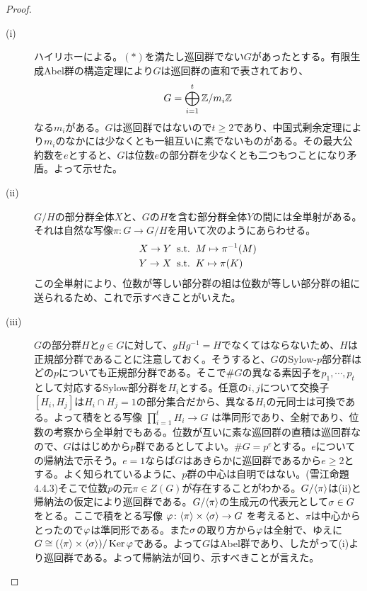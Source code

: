 \begin{proof} ${}$
  \begin{description}
    \item[(i)] ハイリホーによる。$(*)$を満たし巡回群でない$G$があったとする。有限生成Abel群の構造定理により$G$は巡回群の直和で表されており、
    \[
    G = \bigoplus_{i=1}^t {\mathbb Z} / m_i {\mathbb Z}
    \]
    なる$m_i$がある。$G$は巡回群ではないので$t \geq 2$であり、中国式剰余定理により$m_i$のなかには少なくとも一組互いに素でないものがある。その最大公約数を$e$とすると、$G$は位数$e$の部分群を少なくとも二つもつことになり矛盾。よって示せた。
    \item[(ii)] $G/H$の部分群全体$X$と、$G$の$H$を含む部分群全体$Y$の間には全単射がある。それは自然な写像$\pi \colon G \to G/H$を用いて次のようにあらわせる。
    \begin{align*}
      &X \to Y \; \; \text{s.t.} \; \; M \mapsto \pi^{-1}(M) \\
      &Y \to X \; \; \text{s.t.} \; \; K \mapsto \pi(K)
    \end{align*}
    この全単射により、位数が等しい部分群の組は位数が等しい部分群の組に送られるため、これで示すべきことがいえた。
    \item[(iii)] $G$の部分群$H$と$g \in G$に対して、$gHg^{-1} = H$でなくてはならないため、$H$は正規部分群であることに注意しておく。そうすると、$G$のSylow-$p$部分群はどの$p$についても正規部分群である。そこで$\# G$の異なる素因子を$p_1, \cdots ,p_t$として対応するSylow部分群を$H_i$とする。任意の$i,j$について交換子$[H_i,H_j]$は$H_i \cap H_j = 1$の部分集合だから、異なる$H_i$の元同士は可換である。よって積をとる写像
    $
    \prod_{i=1}^t H_i \to G
    $
    は準同形であり、全射であり、位数の考察から全単射でもある。位数が互いに素な巡回群の直積は巡回群なので、$G$ははじめから$p$群であるとしてよい。$\# G = p^e$とする。$e$についての帰納法で示そう。$e=1$ならば$G$はあきらかに巡回群であるから$e \geq 2$とする。よく知られているように、$p$群の中心は自明ではない。(雪江\cite{雪代1}命題4.4.3)そこで位数$p$の元$\pi \in Z(G)$が存在することがわかる。$G/\langle \pi \rangle$は(ii)と帰納法の仮定により巡回群である。$G/\langle \pi \rangle$の生成元の代表元として${\sigma} \in G$をとる。ここで積をとる写像
    $
    {\varphi} \colon \langle \pi \rangle \times \langle {\sigma} \rangle \to G
    $
    を考えると、$\pi$は中心からとったので${\varphi}$は準同形である。また${\sigma}$の取り方から${\varphi}$は全射で、ゆえに$G \cong (\langle \pi \rangle \times \langle {\sigma} \rangle) / \operatorname{Ker} {\varphi}$である。よって$G$はAbel群であり、したがって(i)より巡回群である。よって帰納法が回り、示すべきことが言えた。
    \end{description}
\end{proof}

